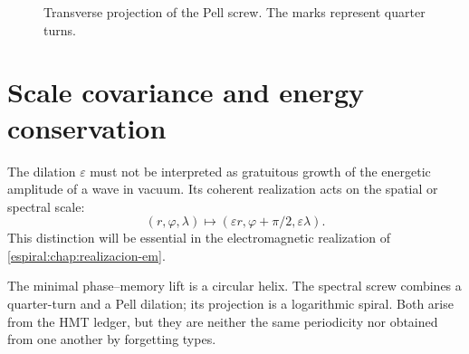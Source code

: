 \begin{figure}[htbp]
\centering
{}
\caption{Transverse projection of the Pell screw. The marks represent quarter turns.}
\label{espiral:fig:tornillo-pell}
\end{figure}

\section{Scale covariance and energy conservation}

The dilation \(\varepsilon\) must not be interpreted as gratuitous growth
of the energetic amplitude of a wave in vacuum. Its coherent realization
acts on the spatial or spectral scale:
\[
 (r,\varphi,\lambda)
 \longmapsto
 (\varepsilon r,\varphi+\pi/2,\varepsilon\lambda).
\]
This distinction will be essential in the electromagnetic realization of
\cref{espiral:chap:realizacion-em}.

\begin{resultbox}[title={Exact compatibility between the Pell spectral screw and the phase--memory suspension}]
The minimal phase--memory lift is a circular helix. The spectral screw
combines a quarter-turn and a Pell dilation; its projection is a logarithmic
spiral. Both arise from the HMT ledger, but they are neither the same
periodicity nor obtained from one another by forgetting types.
\end{resultbox}
